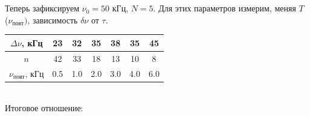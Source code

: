\documentclass[a4paper,12pt]{article}
\begin{document}
\begin{figure}[h]
    \centering
    \\
\end{figure}\\

Теперь зафиксируем $\nu_0 = 50$ кГц, $N = 5$. Для этих параметров измерим, меняя $T$ ($\nu_{\text{повт}})$, зависимость $\delta \nu$ от $\tau$. 
\begin{table}[h]
\centering
\begin{tabular}{|c|c|c|c|c|c|c|}
\hline
$\Delta \nu$, кГц       & 23 & 32 & 35 & 38 & 35 & 45 \\ \hline
$n$                                                   & 42 & 33 & 18 & 13 & 10 &  8 \\ \hline
$\nu_{\text{повт}}$, кГц & 0.5 & 1.0  & 2.0  & 3.0  & 4.0 & 6.0  \\ \hline
\end{tabular}
\end{table}\\
Итоговое отношение:
\end{document}
